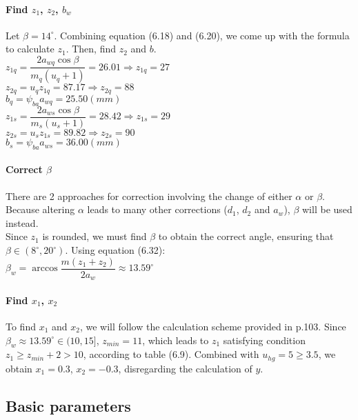 \paragraph{Find $ z_1 $, $ z_2 $, $ b_w $} Let $ \beta = 14^\circ $. Combining equation (6.18) and (6.20), we come up with the formula to calculate $ z_1 $. Then, find $ z_2 $ and $ b $.\\
$ z_{1q} = \dfrac{2a_{wq}\cos\beta}{m_q(u_q+1)} = 26.01 \Rightarrow z_{1q} = 27$\\
$ z_{2q} = u_{q}z_{1q} = 87.17 \Rightarrow z_{2q} = 88 $\\
$ b_q = \psi_{ba}a_{wq} = 25.50\unit{(mm)}$\\
$ z_{1s} = \dfrac{2a_{ws}\cos\beta}{m_s(u_s+1)} = 28.42 \Rightarrow z_{1s} = 29$\\
$ z_{2s} = u_{s}z_{1s} = 89.82 \Rightarrow z_{2s} = 90 $\\
$ b_s = \psi_{ba}a_{ws} = 36.00\unit{(mm)}$ 

\paragraph{Correct $ \beta $} There are 2 approaches for correction involving the change of either $ \alpha $ or $ \beta $. Because altering $ \alpha $ leads to many other corrections ($ d_1 $, $ d_2 $ and $ a_w $), $ \beta $ will be used instead.\\
Since $ z_1 $ is rounded, we must find $ \beta $ to obtain the correct angle, ensuring that $ \beta \in (8^\circ, 20^\circ) $. Using equation (6.32):\\
$ \beta_w = \arccos\dfrac{m(z_1+z_2)}{2a_w} \approx 13.59^\circ$

\paragraph{Find $ x_1 $, $ x_2 $} To find $ x_1 $ and $ x_2 $, we will follow the calculation scheme provided in p.103. Since $ \beta_w \approx 13.59^\circ \in (10,15]$, $ z_{min} = 11$, which leads to $ z_1 $ satisfying condition $ z_1 \geq z_{min} + 2 > 10 $, according to table (6.9). Combined with $ u_{hg} = 5 \geq 3.5 $, we obtain $ x_1 = 0.3 $, $ x_2 = -0.3 $, disregarding the calculation of $ y $.

\subsection{Basic parameters}

